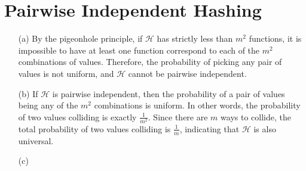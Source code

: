 \documentclass[11pt]{article}
\theoremstyle{definition}
\theoremstyle{remark}
\begin{document}
\section{Pairwise Independent Hashing}
\begin{enumerate}
\item[(a)] By the pigeonhole principle, if $\mathcal{H}$ has strictly less than $m^2$ functions, it is impossible to have at least one function correspond to each of the $m^2$ combinations of values. Therefore, the probability of picking any pair of values is not uniform, and $\mathcal{H}$ cannot be pairwise independent.

\item[(b)] If $\mathcal{H}$ is pairwise independent, then the probability of a pair of values being any of the $m^2$ combinations is uniform. In other words, the probability of two values colliding is exactly $\frac{1}{m^2}$. Since there are $m$ ways to collide, the total probability of two values colliding is $\frac{1}{m}$, indicating that $\mathcal{H}$ is also universal.

\item[(c)]
\end{enumerate}
\end{document}
